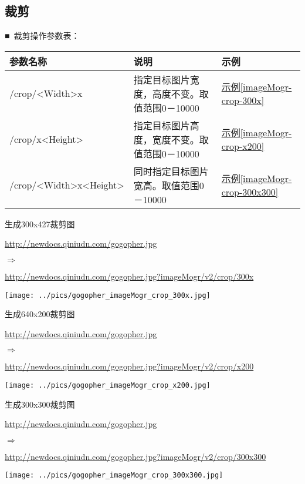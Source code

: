 \documentclass[11pt, oneside]{book}
\newcommand{\qsym}[1]{
\footnotesize
\noindent
#1\par
\normalsize
}
\newcommand{\qpara}[1]{
\vspace{0.3em}
\noindent
#1\par
\vspace{0.3em}
}
\newcommand{\qsamplelink}[1]{
\vspace{0.2em}
\noindent
#1\par
\vspace{0.1em}
}
\newcommand{\qurl}[1]{\footnotesize\url{#1}\normalsize}
\newcommand{\qtable}[1]{\footnotesize\vspace{0.5em}#1\vspace{0.5em}\normalsize}
\newcommand{\qsample}[1]{\hyperref[#1]{示例\ref*{#1}}}
\begin{document}
\clearpage

\subsection{裁剪}

\qpara{■\ 裁剪操作参数表：}
\qtable{
\label{crop-spec}
\begin{tabular}[t]{|l|p{20em}|p{5em}|}
\hline
参数名称 & 说明 & 示例 \\
\hline
/crop/\textless Width\textgreater x & 指定目标图片宽度，高度不变。取值范围0－10000 & \qsample{imageMogr-crop-300x} \\
\hline
/crop/x\textless Height\textgreater & 指定目标图片高度，宽度不变。取值范围0－10000 & \qsample{imageMogr-crop-x200} \\
\hline
/crop/\textless Width\textgreater x\textless Height\textgreater & 同时指定目标图片宽高。取值范围0－10000 & \qsample{imageMogr-crop-300x300} \\
\hline
\end{tabular}
}

\begin{sample}
  \caption{生成300x427裁剪图}
    \qsamplelink{\qurl{http://newdocs.qiniudn.com/gogopher.jpg}}
    \qsym{$\Rightarrow$}
    \qsamplelink{\qurl{http://newdocs.qiniudn.com/gogopher.jpg?imageMogr/v2/crop/300x}}

    \begin{center}
      \texttt{[image: ../pics/gogopher\_imageMogr\_crop\_300x.jpg]}
    \end{center}
  \label{imageMogr-crop-300x}
\end{sample}

\begin{sample}
  \caption{生成640x200裁剪图}
    \qsamplelink{\qurl{http://newdocs.qiniudn.com/gogopher.jpg}}
    \qsym{$\Rightarrow$}
    \qsamplelink{\qurl{http://newdocs.qiniudn.com/gogopher.jpg?imageMogr/v2/crop/x200}}

    \begin{center}
      \texttt{[image: ../pics/gogopher\_imageMogr\_crop\_x200.jpg]}
    \end{center}
  \label{imageMogr-crop-x200}
\end{sample}

\begin{sample}
  \caption{生成300x300裁剪图}
    \qsamplelink{\qurl{http://newdocs.qiniudn.com/gogopher.jpg}}
    \qsym{$\Rightarrow$}
    \qsamplelink{\qurl{http://newdocs.qiniudn.com/gogopher.jpg?imageMogr/v2/crop/300x300}}

    \begin{center}
      \texttt{[image: ../pics/gogopher\_imageMogr\_crop\_300x300.jpg]}
    \end{center}
  \label{imageMogr-crop-300x300}
\end{sample}
\end{document}
